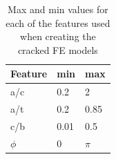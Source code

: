 \begin{table}[]
\centering
\begin{tabular}{|l|l|l|}
\hline
\textbf{Feature} & \textbf{min} & \textbf{max} \\ \hline
a/c              & 0.2          & 2            \\ \hline
a/t              & 0.2          & 0.85          \\ \hline
c/b              & 0.01         & 0.5          \\ \hline
$\phi$           & 0            & $\pi$        \\ \hline
\end{tabular}
\caption{Max and min values for each of the features used when creating the cracked FE models}
\label{table_feat_range}
\end{table}

